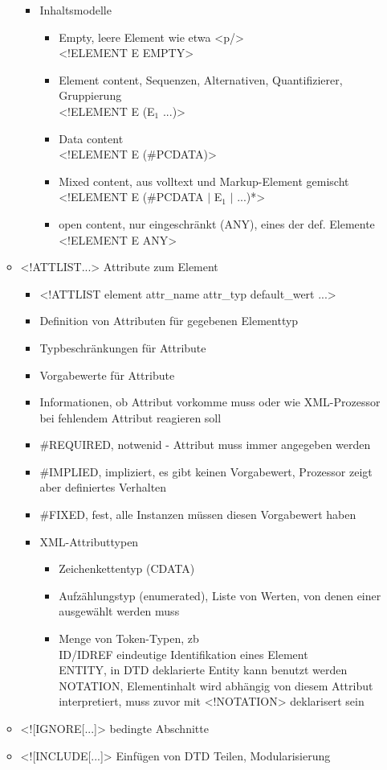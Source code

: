 \begin{itemize}
\begin{itemize}
\begin{itemize}
			\item Inhaltsmodelle
			\begin{itemize}
				\item Empty, leere Element wie etwa <p/>\\
				<!ELEMENT E EMPTY>
				\item Element content, Sequenzen, Alternativen, Quantifizierer, Gruppierung\\
				<!ELEMENT E (E$_1$ ...)>
				\item Data content\\
				<!ELEMENT E (\#PCDATA)>
				\item Mixed content, aus volltext und Markup-Element gemischt\\
				<!ELEMENT E (\#PCDATA $\mid$ E$_1$ $\mid$ ...)*>
				\item open content, nur eingeschränkt (ANY), eines der def. Elemente\\
				<!ELEMENT E ANY>
			\end{itemize}
		\end{itemize}
		\item <!ATTLIST...> Attribute zum Element
		\begin{itemize}
			\item <!ATTLIST element attr\_name attr\_typ default\_wert ...>
			\item Definition von Attributen für gegebenen Elementtyp
			\item Typbeschränkungen für Attribute
			\item Vorgabewerte für Attribute
			\item Informationen, ob Attribut vorkomme muss oder wie XML-Prozessor bei fehlendem Attribut reagieren soll
			\item \#REQUIRED, notwenid - Attribut muss immer angegeben werden
			\item \#IMPLIED, impliziert, es gibt keinen Vorgabewert, Prozessor zeigt aber definiertes Verhalten
			\item \#FIXED, fest, alle Instanzen müssen diesen Vorgabewert haben
			\item XML-Attributtypen
			\begin{itemize}
				\item Zeichenkettentyp (CDATA)
				\item Aufzählungstyp (enumerated), Liste von Werten, von denen einer ausgewählt werden muss
				\item Menge von Token-Typen, zb\\
				ID/IDREF eindeutige Identifikation eines Element\\
				ENTITY, in DTD deklarierte Entity kann benutzt werden\\
				NOTATION, Elementinhalt wird abhängig von diesem Attribut interpretiert, muss zuvor mit <!NOTATION> deklarisert sein
			\end{itemize}
		\end{itemize}
		\item <![IGNORE[...]> bedingte Abschnitte
		\item <![INCLUDE[...]> Einfügen von DTD Teilen, Modularisierung
	\end{itemize}
	

\end{itemize}
